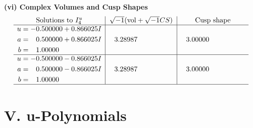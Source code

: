 \documentclass[1p]{elsarticle_modified}
\theoremstyle{definition}
\newcommand{\I}{\sqrt{-1}}
\begin{document}
\newpage\flushleft \textbf{(vi) Complex Volumes and Cusp Shapes}
$$\begin{array}{c|c|c}  
\text{Solutions to }I^u_{4}& \I (\text{vol} + \sqrt{-1}CS) & \text{Cusp shape}\\
 \hline 
\begin{aligned}
u &= -0.500000 + 0.866025 I \\
a &= \phantom{-}0.500000 + 0.866025 I \\
b &= \phantom{-}1.00000\phantom{ +0.000000I}\end{aligned}
 & \phantom{-}3.28987\phantom{ +0.000000I} & \phantom{-}3.00000\phantom{ +0.000000I} \\ \hline\begin{aligned}
u &= -0.500000 - 0.866025 I \\
a &= \phantom{-}0.500000 - 0.866025 I \\
b &= \phantom{-}1.00000\phantom{ +0.000000I}\end{aligned}
 & \phantom{-}3.28987\phantom{ +0.000000I} & \phantom{-}3.00000\phantom{ +0.000000I}\\
 \hline 
 \end{array}$$\newpage
\newpage\renewcommand{\arraystretch}{1}
\centering \section*{ V. u-Polynomials}
\end{document}
